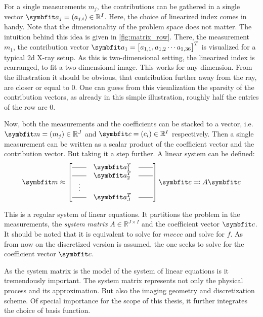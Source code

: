 For a single measurements \(m_j\), the contributions can be gathered in a single vector \(\mvec{a}_j
= (a_{j,i}) \in \mathbb{R}^I\). Here, the choice of linearized index comes in handy. Note that the
dimensionality of the problem space does not matter. The intuition behind this idea is given in
\autoref{fig:matrix_row}. There, the measurement \(m_1\), the contribution vector \(\mvec{a}_{1} =
\begin{bmatrix}a_{1, 1}, a_{1, 2} \cdots a_{1,36}\end{bmatrix}^T\) is visualized for a typical
\(2\)d X-ray setup. As this is two-dimensional setting, the linearized index is rearranged, to fit a
two-dimensional image. This works for any dimension. From the illustration it should be obvious,
that contribution further away from the ray, are closer or equal to \(0\). One can guess from this
visualization the sparsity of the contribution vectors, as already in this simple illustration,
roughly half the entries of the row are \(0\).

Now, both the measurements and the coefficients can be stacked to a vector, i.e.\ \(\mvec{m} = (m_j)
\in \mathbb{R}^J\) and \(\mvec{c} = (c_i) \in \mathbb{R}^I\) respectively. Then a single measurement
can be written as a scalar product of the coefficient vector and the contribution vector. But taking
it a step further. A linear system can be defined:
\begin{equation}\label{eq:system_lin_equation}
	\mvec{m} \approx
	\begin{bmatrix}
		\rule[.5ex]{2em}{0.4pt} & \mvec{a}_1^T & \rule[.5ex]{2em}{0.4pt} \\
		\rule[.5ex]{2em}{0.4pt} & \mvec{a}_2^T & \rule[.5ex]{2em}{0.4pt} \\
		\vdots                                                           \\
		\rule[.5ex]{2em}{0.4pt} & \mvec{a}_J^T & \rule[.5ex]{2em}{0.4pt}
	\end{bmatrix} \mvec{c} \eqcolon A \mvec{c}
\end{equation}

This is a regular system of linear equations. It partitions the problem in the measurements, the
\textit{system matrix} \(A \in \mathbb{R}^{J \times I}\) and the coefficient vector \(\mvec{c}\). It
should be noted that it is equivalent to solve for \(mvec{c}\) and solve for \(f\). As from now on
the discretized version is assumed, the one seeks to solve for the coefficient vector \(\mvec{c}\).

As the system matrix is the model of the system of linear equations is it tremendously important.
The system matrix represents not only the physical process and its approximation. But also the
imaging geometry and discretization scheme. Of special importance for the scope of this thesis, it
further integrates the choice of basis function.

